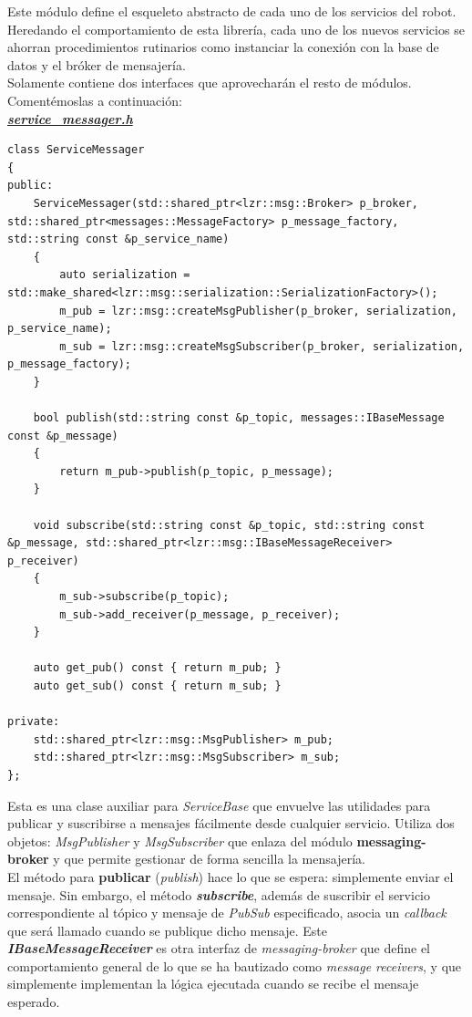 Este módulo define el esqueleto abstracto de cada uno de los servicios del robot. Heredando el comportamiento de esta librería, cada uno de los nuevos servicios se ahorran procedimientos rutinarios como instanciar la conexión con la base de datos y el bróker de mensajería.\\

Solamente contiene dos interfaces que aprovecharán el resto de módulos. Comentémoslas a continuación:\\

\textbf{\textit{\href{https://github.com/adrianmorente/lazarillo-embedded/blob/master/service-base/inc/service-base/service_base.h}{service\_messager.h}}}
\begin{lstlisting}
class ServiceMessager
{
public:
	ServiceMessager(std::shared_ptr<lzr::msg::Broker> p_broker, std::shared_ptr<messages::MessageFactory> p_message_factory, std::string const &p_service_name)
	{
		auto serialization = std::make_shared<lzr::msg::serialization::SerializationFactory>();
		m_pub = lzr::msg::createMsgPublisher(p_broker, serialization, p_service_name);
		m_sub = lzr::msg::createMsgSubscriber(p_broker, serialization, p_message_factory);
	}
	
	bool publish(std::string const &p_topic, messages::IBaseMessage const &p_message)
	{
		return m_pub->publish(p_topic, p_message);
	}

	void subscribe(std::string const &p_topic, std::string const &p_message, std::shared_ptr<lzr::msg::IBaseMessageReceiver> p_receiver)
	{
		m_sub->subscribe(p_topic);
		m_sub->add_receiver(p_message, p_receiver);
	}
	
	auto get_pub() const { return m_pub; }
	auto get_sub() const { return m_sub; }
	
private:
	std::shared_ptr<lzr::msg::MsgPublisher> m_pub;
	std::shared_ptr<lzr::msg::MsgSubscriber> m_sub;
};
\end{lstlisting}

Esta es una clase auxiliar para \textit{ServiceBase} que envuelve las utilidades para publicar y suscribirse a mensajes fácilmente desde cualquier servicio. Utiliza dos objetos: \textit{MsgPublisher} y \textit{MsgSubscriber} que enlaza del módulo \textbf{messaging-broker} y que permite gestionar de forma sencilla la mensajería.\\

El método para \textbf{publicar} (\textit{publish}) hace lo que se espera: simplemente enviar el mensaje. Sin embargo, el método \textbf{\textit{subscribe}}, además de suscribir el servicio correspondiente al tópico y mensaje de \textit{PubSub} especificado, asocia un \textit{callback} que será llamado cuando se publique dicho mensaje. Este \textbf{\textit{IBaseMessageReceiver}} es otra interfaz de \textit{messaging-broker} que define el comportamiento general de lo que se ha bautizado como \textit{message receivers}, y que simplemente implementan la lógica ejecutada cuando se recibe el mensaje esperado.\\

